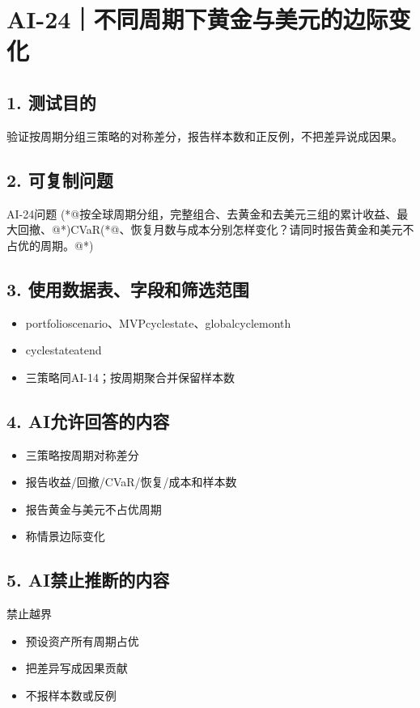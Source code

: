 \documentclass[UTF8,openany,zihao=-4]{ctexbook}
\renewcommand{\_}{\textunderscore\allowbreak}
\begin{document}
\clearpage
\section{AI-24｜不同周期下黄金与美元的边际变化}
\subsection*{1. 测试目的}
验证按周期分组三策略的对称差分，报告样本数和正反例，不把差异说成因果。


\subsection*{2. 可复制问题}
\begin{PromptBox}{AI-24问题}
(*@{\promptcjk 按全球周期分组，完整组合、去黄金和去美元三组的累计收益、最大回撤、}@*)CVaR(*@{\promptcjk 、恢复月数与成本分别怎样变化？请同时报告黄金和美元不占优的周期。}@*)
\end{PromptBox}

\subsection*{3. 使用数据表、字段和筛选范围}
\begin{itemize}
\item portfolio\_scenario、MVP\_cycle\_state、global\_cycle\_month
\item cycle\_state\_at\_end
\item 三策略同AI-14；按周期聚合并保留样本数
\end{itemize}

\subsection*{4. AI允许回答的内容}
\begin{itemize}
\item 三策略按周期对称差分
\item 报告收益/回撤/CVaR/恢复/成本和样本数
\item 报告黄金与美元不占优周期
\item 称情景边际变化
\end{itemize}

\subsection*{5. AI禁止推断的内容}
\begin{dangerbox}{禁止越界}
\begin{itemize}
\item 预设资产所有周期占优
\item 把差异写成因果贡献
\item 不报样本数或反例
\end{itemize}
\end{dangerbox}
\end{document}
